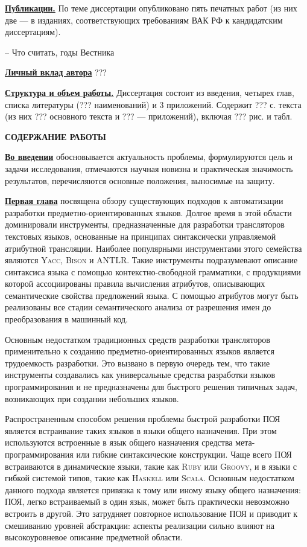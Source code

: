 \documentclass[12pt,a4paper]{article}
\newcommand{\tool}[1]{\textsc{#1}}
\theoremstyle{definition}
\theoremstyle{plain}
\newcommand{\afsection}[1]{\par \begin{center}\textbf{\MakeUppercase{#1}}\end{center}}
\newcommand{\afsubsection}[1]{\par \textbf{\underline{#1}}}
\begin{document}
\afsubsection{Публикации.} По теме диссертации опубликовано пять печатных работ (из них две --- в изданиях, соответствующих требованиям ВАК РФ к кандидатским диссертациям).

-- Что считать, годы Вестника

\afsubsection{Личный вклад автора}
???

\afsubsection{Структура и объем работы.} Диссертация состоит из введения, четырех глав, списка литературы (??? наименований) и 3 приложений. Содержит ??? с. текста (из них ??? основного текста и ??? --- приложений), включая ??? рис. и табл.

\afsection{Содержание работы}

\afsubsection{Во введении} обосновывается актуальность проблемы, формулируются цель и задачи исследования, отмечаются научная новизна и практическая значимость результатов, перечисляются основные положения, выносимые на защиту.

\afsubsection{Первая глава} посвящена обзору существующих подходов к автоматизации разработки предметно-ориентированных языков. Долгое время в этой области доминировали инструменты, предназначенные для разработки трансляторов текстовых языков, основанные на принципах синтаксически управляемой атрибутной трансляции. Наиболее популярными инструментами этого семейства являются \tool{Yacc}, \tool{Bison} и \tool{ANTLR}. Такие инструменты подразумевают описание синтаксиса языка с помощью контекстно-свободной грамматики, с продукциями которой ассоциированы правила вычисления атрибутов, описывающих семантические свойства предложений языка. С помощью атрибутов могут быть реализованы все стадии семантического анализа от разрешения имен до преобразования в машинный код. 

Основным недостатком традиционных средств разработки трансляторов применительно к созданию предметно-ориентированных языков является трудоемкость разработки. Это вызвано в первую очередь тем, что такие инструменты создавались как универсальные средства разработки языков программирования и не предназначены для быстрого решения типичных задач, возникающих при создании небольших языков.

Распространенным способом решения проблемы быстрой разработки ПОЯ является встраивание таких языков в языки общего назначения. При этом используются встроенные в язык общего назначения средства мета-программирования или гибкие синтаксические конструкции. Чаще всего ПОЯ встраиваются в динамические языки, такие как \tool{Ruby} или \tool{Groovy}, и в языки с гибкой системой типов, такие как \tool{Haskell} или \tool{Scala}. Основным недостатком данного подхода является привязка к тому или иному языку общего назначения: ПОЯ, легко встраиваемый в один язык, может быть практически невозможно встроить в другой. Это затрудняет повторное использование ПОЯ и приводит к смешиванию уровней абстракции: аспекты реализации сильно влияют на высокоуровневое описание предметной области.
\end{document}
